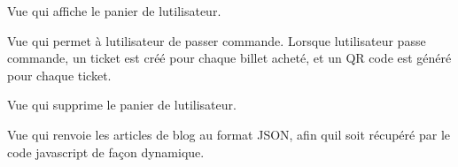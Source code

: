 \documentclass[letterpaper,10pt,english]{sphinxmanual}
\begin{document}

\begin{fulllineitems}
\label{\detokenize{store:store.views.cart}}
\pysigstartsignatures
{}
\pysigstopsignatures
\sphinxAtStartPar
Vue qui affiche le panier de l\textquotesingle{}utilisateur.

\end{fulllineitems}


\begin{fulllineitems}
\label{\detokenize{store:store.views.checkout}}
\pysigstartsignatures
{}
\pysigstopsignatures
\sphinxAtStartPar
Vue qui permet à l\textquotesingle{}utilisateur de passer commande. Lorsque l\textquotesingle{}utilisateur passe commande, un ticket est créé pour chaque billet acheté, et un QR code est généré pour chaque ticket.

\end{fulllineitems}


\begin{fulllineitems}
\label{\detokenize{store:store.views.delete_cart}}
\pysigstartsignatures
{}
\pysigstopsignatures
\sphinxAtStartPar
Vue qui supprime le panier de l\textquotesingle{}utilisateur.

\end{fulllineitems}


\begin{fulllineitems}
\label{\detokenize{store:store.views.get_blog_articles}}
\pysigstartsignatures
{}
\pysigstopsignatures
\sphinxAtStartPar
Vue qui renvoie les articles de blog au format JSON, afin qu\textquotesingle{}il soit récupéré par le code javascript de façon dynamique.

\end{fulllineitems}
\end{document}
